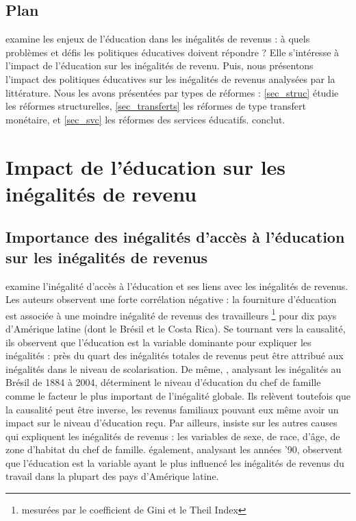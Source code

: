 \documentclass[pagesize, twoside=off, bibliography=totoc, DIV=calc, fontsize=12pt, a4paper, french]{scrartcl}
\begin{document}
\subsection{Plan}

 examine les enjeux de l’éducation dans les inégalités de revenus : à quels problèmes et défis les politiques éducatives doivent répondre ? Elle s’intéresse à l’impact de l’éducation sur les inégalités de revenu. Puis, nous présentons l’impact des politiques éducatives sur les inégalités de revenus analysées par la littérature. Nous les avons présentées par types de réformes : \cref{sec_struc} étudie les réformes structurelles, \cref{sec_transferts} les réformes de type transfert monétaire, et \cref{sec_svc} les réformes des services éducatifs.  conclut.

\section{Impact de l’éducation sur les inégalités de revenu}

\label{sec_educ}

\subsection{Importance des inégalités d’accès à l’éducation sur les inégalités de revenus}

 examine l’inégalité d’accès à l’éducation et ses liens avec les inégalités de revenus. Les auteurs observent une forte corrélation négative : la fourniture d’éducation est associée à une moindre inégalité de revenus des travailleurs 
\footnote{mesurées par le coefficient de Gini et le Theil Index} pour dix pays d’Amérique latine (dont le Brésil et le Costa Rica). 
Se tournant vers la causalité, ils observent que l’éducation est la variable dominante pour expliquer les inégalités : près du quart des inégalités totales de revenus peut être attribué aux inégalités dans le niveau de scolarisation. 
De même, \citet{ferreira_rise_2008}, analysant les inégalités au Brésil de 1884 à 2004, déterminent le niveau d’éducation du chef de famille comme le facteur le plus important de l’inégalité globale. 
Ils relèvent toutefois que la causalité peut être inverse, les revenus familiaux pouvant eux même avoir un impact sur le niveau d'éducation reçu. 
Par ailleurs, \citet{ferreira_rise_2008} insiste sur les autres causes qui expliquent les inégalités de revenus : les variables de sexe, de race, d’âge, de zone d’habitat du chef de famille. 
 également, analysant les années ’90, observent que l’éducation est la variable ayant le plus influencé les inégalités de revenus du travail dans la plupart des pays d’Amérique latine.
\end{document}
